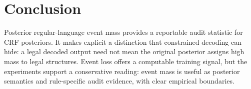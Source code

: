 \section{Conclusion}

Posterior regular-language event mass provides a reportable audit statistic for
CRF posteriors.  It makes explicit a distinction that constrained decoding can
hide: a legal decoded output need not mean the original posterior assigns high
mass to legal structures.  Event loss offers a computable training signal, but
the experiments support a conservative reading: event mass is useful as
posterior semantics and rule-specific audit evidence, with clear empirical
boundaries.
